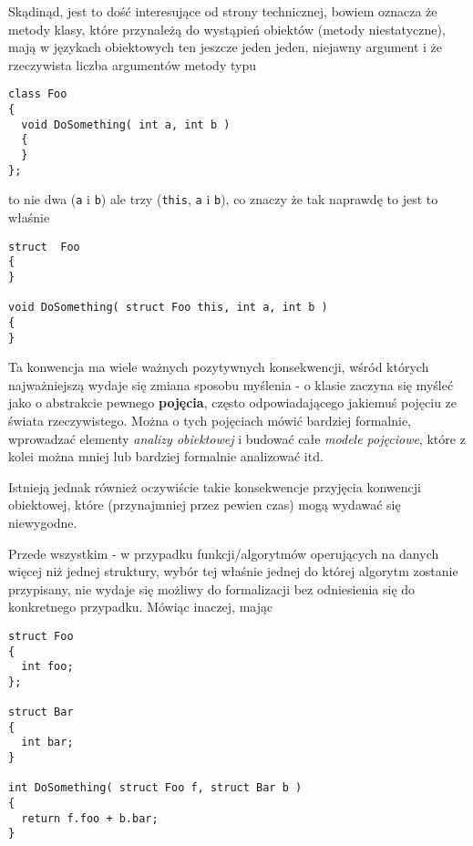 Skądinąd, jest to dość interesujące od strony technicznej, bowiem oznacza że metody klasy, które przynależą
do wystąpień obiektów (metody niestatyczne), mają w językach obiektowych ten jeszcze jeden jeden, niejawny argument 
i że rzeczywista liczba argumentów metody typu

\begin{scriptsize}
\begin{verbatim}
class Foo
{
  void DoSomething( int a, int b ) 
  {
  }
};
\end{verbatim}
\end{scriptsize}

to nie dwa ({\tt a} i {\tt b}) ale trzy ({\tt this}, {\tt a} i {\tt b}), co znaczy że tak naprawdę to jest to właśnie

\begin{scriptsize}
\begin{verbatim}
struct  Foo
{
}

void DoSomething( struct Foo this, int a, int b ) 
{
}
\end{verbatim}
\end{scriptsize}

Ta konwencja ma wiele ważnych pozytywnych konsekwencji, wśród których najważniejszą wydaje się zmiana sposobu
myślenia - o klasie zaczyna się myśleć jako o abstrakcie pewnego {\bf pojęcia}, często odpowiadającego
jakiemuś pojęciu ze świata rzeczywistego. Można o tych pojęciach mówić bardziej formalnie, wprowadzać elementy
{\em analizy obiektowej} i budować całe {\em modele pojęciowe}, które z kolei można mniej lub bardziej formalnie 
analizować itd.

Istnieją jednak również oczywiście takie konsekwencje przyjęcia konwencji obiektowej, które 
(przynajmniej przez pewien czas) mogą wydawać się niewygodne. 

Przede wszystkim - w przypadku funkcji/algorytmów operujących na danych więcej niż jednej struktury,
wybór tej właśnie jednej do której algorytm zostanie przypisany, nie wydaje się możliwy do formalizacji bez odniesienia
się do konkretnego przypadku. Mówiąc inaczej, mając

\begin{scriptsize}
\begin{verbatim}
struct Foo
{
  int foo;
};

struct Bar
{
  int bar;
}

int DoSomething( struct Foo f, struct Bar b ) 
{
  return f.foo + b.bar; 
}
\end{verbatim}
\end{scriptsize}

